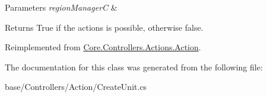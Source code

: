 \begin{DoxyParams}{Parameters}
{\em region\-Manager\-C} & \\
\hline
\end{DoxyParams}
\begin{DoxyReturn}{Returns}
True if the actions is possible, otherwise false.
\end{DoxyReturn}


Reimplemented from \hyperlink{classCore_1_1Controllers_1_1Actions_1_1Action_a405b995343a9394ad19e05a699a4e6d9}{Core.\-Controllers.\-Actions.\-Action}.



The documentation for this class was generated from the following file\-:\begin{DoxyCompactItemize}
\item 
base/\-Controllers/\-Action/Create\-Unit.\-cs\end{DoxyCompactItemize}
